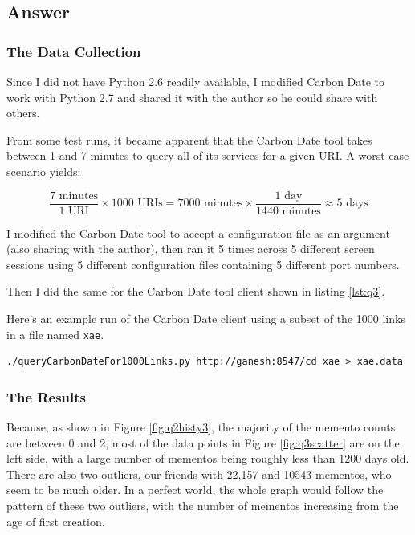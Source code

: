 \documentclass[letterpaper,11pt]{article}
\begin{document}
\newpage
\subsection*{Answer}

\subsubsection*{The Data Collection}
Since I did not have Python 2.6 readily available, I modified Carbon Date to work with Python 2.7 and shared it with the author so he could share with others.

From some test runs, it became apparent that the Carbon Date tool takes between 1 and 7 minutes to query all of its services for a given URI.  A worst case scenario yields:

\[
\frac{7 \textrm{ minutes}}{1 \textrm{ URI}} \times {1000 \textrm{ URIs}} = {7000 \textrm{ minutes}} \times \frac{1 \textrm{ day}}{1440 \textrm{ minutes}} \approx {5 \textrm{ days}}
\]

I modified the Carbon Date tool to accept a configuration file as an argument (also sharing with the author), then ran it 5 times across 5 different screen sessions using 5 different configuration files containing 5 different port numbers.

Then I did the same for the Carbon Date tool client shown in listing \ref{lst:q3}.

Here's an example run of the Carbon Date client using a subset of the 1000 links in a file named \verb+xae+.
\begin{lstlisting}[frame=single]
./queryCarbonDateFor1000Links.py http://ganesh:8547/cd xae > xae.data
\end{lstlisting}

\subsubsection*{The Results}

Because, as shown in Figure \ref{fig:q2histy3}, the majority of the memento counts are between 0 and 2, most of the data points in Figure \ref{fig:q3scatter} are on the left side, with a large number of mementos being roughly less than 1200 days old.  There are also two outliers, our friends with 22,157 and 10543 mementos, who seem to be much older.  In a perfect world, the whole graph would follow the pattern of these two outliers, with the number of mementos increasing from the age of first creation.
\end{document}

